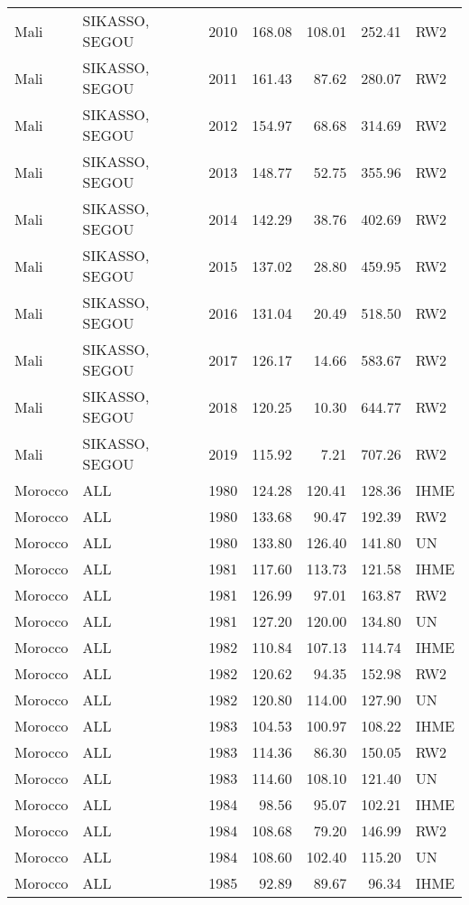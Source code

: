 \begin{longtable}{lllrrrl}
  Mali & SIKASSO, SEGOU & 2010 & 168.08 & 108.01 & 252.41 & RW2 \\ 
  Mali & SIKASSO, SEGOU & 2011 & 161.43 & 87.62 & 280.07 & RW2 \\ 
  Mali & SIKASSO, SEGOU & 2012 & 154.97 & 68.68 & 314.69 & RW2 \\ 
  Mali & SIKASSO, SEGOU & 2013 & 148.77 & 52.75 & 355.96 & RW2 \\ 
  Mali & SIKASSO, SEGOU & 2014 & 142.29 & 38.76 & 402.69 & RW2 \\ 
  Mali & SIKASSO, SEGOU & 2015 & 137.02 & 28.80 & 459.95 & RW2 \\ 
  Mali & SIKASSO, SEGOU & 2016 & 131.04 & 20.49 & 518.50 & RW2 \\ 
  Mali & SIKASSO, SEGOU & 2017 & 126.17 & 14.66 & 583.67 & RW2 \\ 
  Mali & SIKASSO, SEGOU & 2018 & 120.25 & 10.30 & 644.77 & RW2 \\ 
  Mali & SIKASSO, SEGOU & 2019 & 115.92 & 7.21 & 707.26 & RW2 \\ 
  Morocco & ALL & 1980 & 124.28 & 120.41 & 128.36 & IHME \\ 
  Morocco & ALL & 1980 & 133.68 & 90.47 & 192.39 & RW2 \\ 
  Morocco & ALL & 1980 & 133.80 & 126.40 & 141.80 & UN \\ 
  Morocco & ALL & 1981 & 117.60 & 113.73 & 121.58 & IHME \\ 
  Morocco & ALL & 1981 & 126.99 & 97.01 & 163.87 & RW2 \\ 
  Morocco & ALL & 1981 & 127.20 & 120.00 & 134.80 & UN \\ 
  Morocco & ALL & 1982 & 110.84 & 107.13 & 114.74 & IHME \\ 
  Morocco & ALL & 1982 & 120.62 & 94.35 & 152.98 & RW2 \\ 
  Morocco & ALL & 1982 & 120.80 & 114.00 & 127.90 & UN \\ 
  Morocco & ALL & 1983 & 104.53 & 100.97 & 108.22 & IHME \\ 
  Morocco & ALL & 1983 & 114.36 & 86.30 & 150.05 & RW2 \\ 
  Morocco & ALL & 1983 & 114.60 & 108.10 & 121.40 & UN \\ 
  Morocco & ALL & 1984 & 98.56 & 95.07 & 102.21 & IHME \\ 
  Morocco & ALL & 1984 & 108.68 & 79.20 & 146.99 & RW2 \\ 
  Morocco & ALL & 1984 & 108.60 & 102.40 & 115.20 & UN \\ 
  Morocco & ALL & 1985 & 92.89 & 89.67 & 96.34 & IHME \\ 

\end{longtable}
